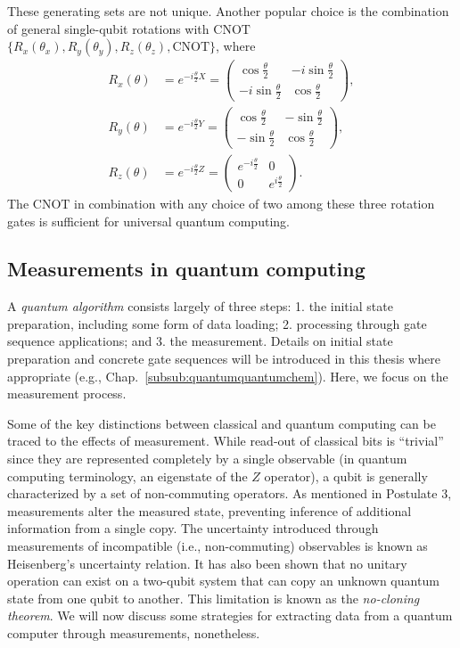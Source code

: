 \documentclass[../main.tex]{subfiles}
\begin{document}
 These generating sets are not unique. Another popular choice is the combination of general single-qubit rotations with $\mathrm{CNOT}$ $\{R_x(\theta_x), R_y(\theta_y), R_z(\theta_z),  \mathrm{CNOT}\}$, where
\begin{align}
        R_x(\theta) &= e^{-i \frac{\theta}{2} X } = 
    \begin{pmatrix}
        \cos{\frac{\theta}{2}} & -i \sin{\frac{\theta}{2}} \\
        -i \sin{\frac{\theta}{2}} & \cos{\frac{\theta}{2}}
    \end{pmatrix}, \\
        R_y(\theta) &= e^{-i \frac{\theta}{2} Y } = 
    \begin{pmatrix}
        \cos{\frac{\theta}{2}} & - \sin{\frac{\theta}{2}} \\
        - \sin{\frac{\theta}{2}} & \cos{\frac{\theta}{2}}
    \end{pmatrix}, \\
        R_z(\theta) &= e^{-i \frac{\theta}{2} Z } = 
    \begin{pmatrix}
        e^{-i \frac{\theta}{2} } & 0 \\
        0 & e^{i \frac{\theta}{2} }
    \end{pmatrix}.
\end{align} The $\mathrm{CNOT}$ in combination with any choice of two among these three rotation gates is sufficient for universal quantum computing.

\subsection{Measurements in quantum computing}\label{sec:measure}
A \textit{quantum algorithm} consists largely of three steps: 1. the initial state preparation, including some form of data loading; 2. processing through gate sequence applications; and 3. the measurement. Details on initial state preparation and concrete gate sequences will be introduced in this thesis where appropriate (e.g., Chap.~\ref{subsub:quantumquantumchem}). Here, we focus on the measurement process.

Some of the key distinctions between classical and quantum computing can be traced to the effects of measurement. While read-out of classical bits is ``trivial'' since they are represented completely by a single observable (in quantum computing terminology, an eigenstate of the $Z$ operator), a qubit is generally characterized by a set of non-commuting operators. As mentioned in Postulate 3, measurements alter the measured state, preventing inference of additional information from a single copy. The uncertainty introduced through measurements of incompatible (i.e., non-commuting) observables is known as Heisenberg's uncertainty relation. It has also been shown that no unitary operation can exist on a two-qubit system that can copy an unknown quantum state from one qubit to another. This limitation is known as the \textit{no-cloning theorem}.  We will now discuss some strategies for extracting data from a quantum computer through measurements, nonetheless.
\end{document}
